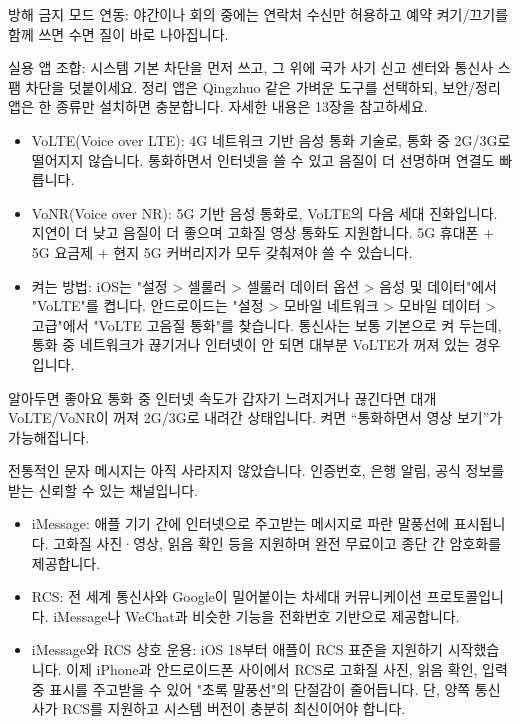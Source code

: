 방해 금지 모드 연동: 야간이나 회의 중에는 연락처 수신만 허용하고 예약 켜기/끄기를 함께 쓰면 수면 질이 바로 나아집니다.

실용 앱 조합: 시스템 기본 차단을 먼저 쓰고, 그 위에 국가 사기 신고 센터와 통신사 스팸 차단을 덧붙이세요. 정리 앱은 Qingzhuo 같은 가벼운 도구를 선택하되, 보안/정리 앱은 한 종류만 설치하면 충분합니다. 자세한 내용은 13장을 참고하세요.


\begin{itemize}
  \item VoLTE(Voice over LTE): 4G 네트워크 기반 음성 통화 기술로, 통화 중 2G/3G로 떨어지지 않습니다. 통화하면서 인터넷을 쓸 수 있고 음질이 더 선명하며 연결도 빠릅니다.
  \item VoNR(Voice over NR): 5G 기반 음성 통화로, VoLTE의 다음 세대 진화입니다. 지연이 더 낮고 음질이 더 좋으며 고화질 영상 통화도 지원합니다. 5G 휴대폰 + 5G 요금제 + 현지 5G 커버리지가 모두 갖춰져야 쓸 수 있습니다.
  \item 켜는 방법: iOS는 "설정 > 셀룰러 > 셀룰러 데이터 옵션 > 음성 및 데이터"에서 "VoLTE"를 켭니다. 안드로이드는 "설정 > 모바일 네트워크 > 모바일 데이터 > 고급"에서 "VoLTE 고음질 통화"를 찾습니다. 통신사는 보통 기본으로 켜 두는데, 통화 중 네트워크가 끊기거나 인터넷이 안 되면 대부분 VoLTE가 꺼져 있는 경우입니다.
\end{itemize}

\begin{tcbinfo}{알아두면 좋아요}
통화 중 인터넷 속도가 갑자기 느려지거나 끊긴다면 대개 VoLTE/VoNR이 꺼져 2G/3G로 내려간 상태입니다. 켜면 “통화하면서 영상 보기”가 가능해집니다.

\end{tcbinfo}


전통적인 문자 메시지는 아직 사라지지 않았습니다. 인증번호, 은행 알림, 공식 정보를 받는 신뢰할 수 있는 채널입니다.

\begin{itemize}
  \item iMessage: 애플 기기 간에 인터넷으로 주고받는 메시지로 파란 말풍선에 표시됩니다. 고화질 사진·영상, 읽음 확인 등을 지원하며 완전 무료이고 종단 간 암호화를 제공합니다.
  \item RCS: 전 세계 통신사와 Google이 밀어붙이는 차세대 커뮤니케이션 프로토콜입니다. iMessage나 WeChat과 비슷한 기능을 전화번호 기반으로 제공합니다.
  \item iMessage와 RCS 상호 운용: iOS 18부터 애플이 RCS 표준을 지원하기 시작했습니다. 이제 iPhone과 안드로이드폰 사이에서 RCS로 고화질 사진, 읽음 확인, 입력 중 표시를 주고받을 수 있어 "초록 말풍선"의 단절감이 줄어듭니다. 단, 양쪽 통신사가 RCS를 지원하고 시스템 버전이 충분히 최신이어야 합니다.
\end{itemize}

